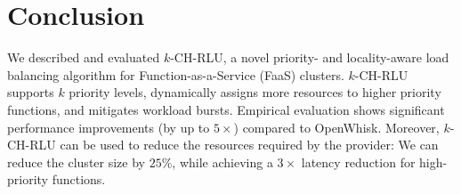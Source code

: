\section{Conclusion}


We described and evaluated $k$-CH-RLU, a novel priority- and locality-aware load balancing algorithm for Function-as-a-Service (FaaS) clusters.
$k$-CH-RLU supports $k$ priority levels, dynamically assigns more resources to higher priority functions, and mitigates workload bursts.
Empirical evaluation shows significant performance improvements (by up to $5\times$) compared to OpenWhisk.
Moreover, $k$-CH-RLU can be used to reduce the resources required by the provider: We can reduce the cluster size by $25\%$, while achieving a $3\times$ latency reduction for high-priority functions.